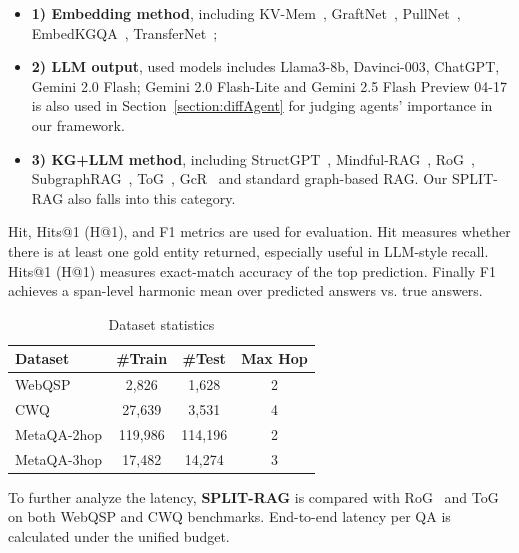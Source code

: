 \documentclass[sigconf]{acmart}
\begin{document}
\begin{itemize}
    \item \textbf{1) Embedding method}, including KV-Mem~\cite{miller2016key}, GraftNet~\cite{sun2018open}, PullNet~\cite{sun2019pullnet}, EmbedKGQA~\cite{saxena2020improving}, TransferNet~\cite{shi2021transfernet}; 

    \item \textbf{2) LLM output}, used models includes Llama3-8b, Davinci-003, ChatGPT, Gemini 2.0 Flash; Gemini 2.0 Flash-Lite and Gemini 2.5 Flash Preview 04-17 is also used in Section~\ref{section:diffAgent} for judging agents' importance in our framework.

\item \textbf{3) KG+LLM method}, including StructGPT~\cite{jiang2023structgpt}, Mindful-RAG~\cite{agrawal2024mindful}, RoG~\cite{luo2023reasoning},  SubgraphRAG~\cite{li2024simple}, ToG~\cite{sun2023think}, GcR~\cite{luo2024graph} and standard graph-based RAG. Our SPLIT-RAG also falls into this category. 
\end{itemize}
 

Hit, Hits@1 (H@1), and F1 metrics are used for evaluation. Hit measures whether there is at least one gold entity returned, especially useful in LLM-style recall. Hits@1 (H@1) measures exact-match accuracy of the top prediction. Finally F1 achieves a span-level harmonic mean over predicted answers vs. true answers.

\begin{table}[h]
  \centering 
  \caption{Dataset statistics}
  \small
  \begin{tabular}{lccc}
    \toprule
    \textbf{Dataset} & \textbf{\#Train} & \textbf{\#Test} & \textbf{Max Hop} \\
    \midrule
    WebQSP       & 2,826   & 1,628    & 2 \\
    CWQ          & 27,639  & 3,531    & 4 \\
    MetaQA-2hop  & 119,986 & 114,196  & 2 \\
    MetaQA-3hop  & 17,482  & 14,274   & 3 \\
    \bottomrule
  \end{tabular}
  \label{table:datasets}
\end{table}

To further analyze the latency, \textbf{SPLIT-RAG} is compared with RoG~\cite{luo2023reasoning} and ToG~\cite{sun2023think} on both WebQSP and CWQ benchmarks. End-to-end latency per QA is calculated under the unified budget.
\end{document}
